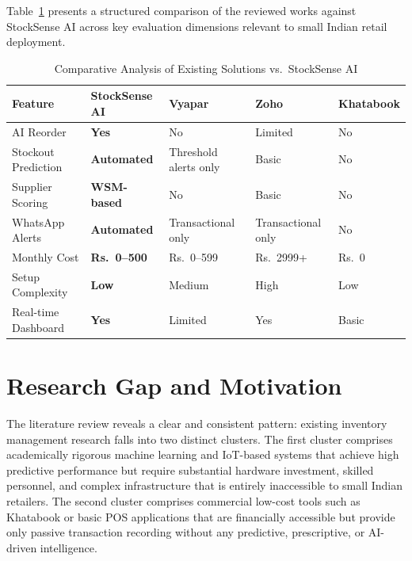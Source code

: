 Table~\ref{tab:litcomp} presents a structured comparison of the reviewed works against StockSense
AI across key evaluation dimensions relevant to small Indian retail deployment.

\begin{table}[H]
\centering
\caption{Comparative Analysis of Existing Solutions vs.\ StockSense AI}
\label{tab:litcomp}
{\singlespacing
\renewcommand{\arraystretch}{1.3}
\begin{tabularx}{\textwidth}{@{} >{\raggedright\arraybackslash}p{4.8cm} >{\raggedright\arraybackslash}X >{\raggedright\arraybackslash}X >{\raggedright\arraybackslash}X >{\raggedright\arraybackslash}X @{}}
\toprule
\textbf{Feature} & \textbf{StockSense AI} & \textbf{Vyapar} & \textbf{Zoho} & \textbf{Khatabook} \\
\midrule
AI Reorder & \textbf{Yes} & No & Limited & No \\
Stockout Prediction & \textbf{Automated} & Threshold alerts only & Basic & No \\
Supplier Scoring & \textbf{WSM-based} & No & Basic & No \\
WhatsApp Alerts & \textbf{Automated} & Transactional only & Transactional only & No \\
Monthly Cost & \textbf{Rs.\ 0--500} & Rs.\ 0--599 & Rs.\ 2999+ & Rs.\ 0 \\
Setup Complexity & \textbf{Low} & Medium & High & Low \\
Real-time Dashboard & \textbf{Yes} & Limited & Yes & Basic \\
\bottomrule
\end{tabularx}
}
\end{table}

\section{Research Gap and Motivation}

The literature review reveals a clear and consistent pattern: existing inventory management
research falls into two distinct clusters. The first cluster comprises academically rigorous
machine learning and IoT-based systems that achieve high predictive performance but require
substantial hardware investment, skilled personnel, and complex infrastructure that is entirely
inaccessible to small Indian retailers. The second cluster comprises commercial low-cost tools
such as Khatabook or basic POS applications that are financially accessible but provide only
passive transaction recording without any predictive, prescriptive, or AI-driven intelligence.

